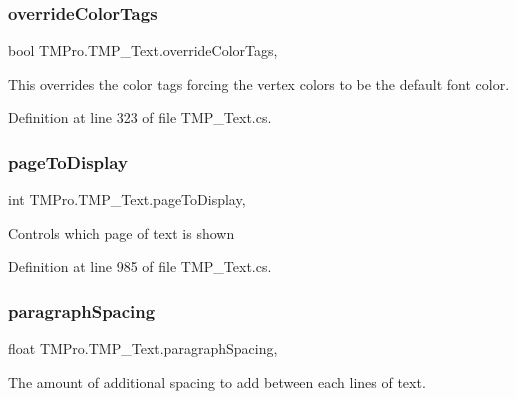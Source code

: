 \subsubsection{\texorpdfstring{overrideColorTags}{overrideColorTags}}
{\footnotesize\ttfamily bool T\+M\+Pro.\+T\+M\+P\+\_\+\+Text.\+override\+Color\+Tags\hspace{0.3cm}{\ttfamily [get]}, {\ttfamily [set]}}



This overrides the color tags forcing the vertex colors to be the default font color. 



Definition at line 323 of file T\+M\+P\+\_\+\+Text.\+cs.

\mbox{\label{class_t_m_pro_1_1_t_m_p___text_af204b1b18dbc4f752600c66c381b6f81}} 
\subsubsection{\texorpdfstring{pageToDisplay}{pageToDisplay}}
{\footnotesize\ttfamily int T\+M\+Pro.\+T\+M\+P\+\_\+\+Text.\+page\+To\+Display\hspace{0.3cm}{\ttfamily [get]}, {\ttfamily [set]}}



Controls which page of text is shown 



Definition at line 985 of file T\+M\+P\+\_\+\+Text.\+cs.

\mbox{\label{class_t_m_pro_1_1_t_m_p___text_a8f5d0190e904f648b43377a5d89b5de7}} 
\subsubsection{\texorpdfstring{paragraphSpacing}{paragraphSpacing}}
{\footnotesize\ttfamily float T\+M\+Pro.\+T\+M\+P\+\_\+\+Text.\+paragraph\+Spacing\hspace{0.3cm}{\ttfamily [get]}, {\ttfamily [set]}}



The amount of additional spacing to add between each lines of text. 



